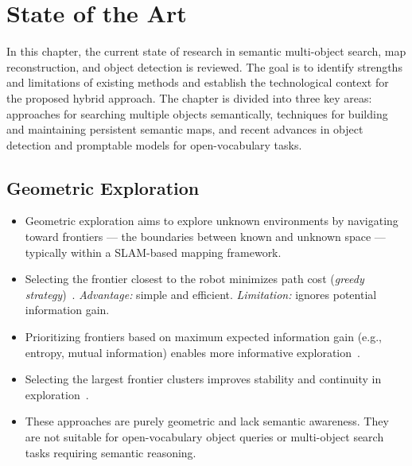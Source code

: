 \chapter{State of the Art}

In this chapter, the current state of research in semantic multi-object search, map reconstruction, and object detection is reviewed. The goal is to identify strengths and limitations of existing methods and establish the technological context for the proposed hybrid approach. The chapter is divided into three key areas: approaches for searching multiple objects semantically, techniques for building and maintaining persistent semantic maps, and recent advances in object detection and promptable models for open-vocabulary tasks.
\section{Geometric Exploration}

\begin{itemize}
    \item Geometric exploration aims to explore unknown environments by navigating toward frontiers — the boundaries between known and unknown space — typically within a SLAM-based mapping framework.
    
    \item Selecting the frontier closest to the robot minimizes path cost (\textit{greedy strategy})~\cite{topiwala2018frontierbasedexplorationautonomous}.  
    \textit{Advantage:} simple and efficient.  
    \textit{Limitation:} ignores potential information gain.
    
    \item Prioritizing frontiers based on maximum expected information gain (e.g., entropy, mutual information) enables more informative exploration~\cite{bourgault2002informationbasedadaptiveexploration, Suresh_2024}.
    
    \item Selecting the largest frontier clusters improves stability and continuity in exploration~\cite{stachniss2009efficientexploration}.
    
    \item These approaches are purely geometric and lack semantic awareness. They are not suitable for open-vocabulary object queries or multi-object search tasks requiring semantic reasoning.
\end{itemize}

